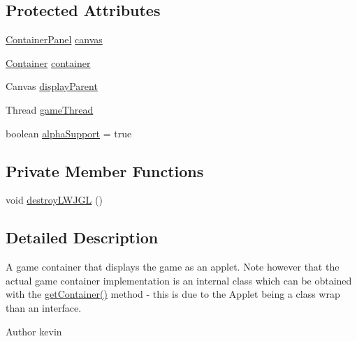 \subsection*{Protected Attributes}
\begin{DoxyCompactItemize}
\item 
\mbox{\hyperlink{classorg_1_1newdawn_1_1slick_1_1_applet_game_container_1_1_container_panel}{Container\+Panel}} \mbox{\hyperlink{classorg_1_1newdawn_1_1slick_1_1_applet_game_container_acf26307e20e497f0fbdabbb5110ab852}{canvas}}
\item 
\mbox{\hyperlink{classorg_1_1newdawn_1_1slick_1_1_applet_game_container_1_1_container}{Container}} \mbox{\hyperlink{classorg_1_1newdawn_1_1slick_1_1_applet_game_container_ad11e66254b14c604db1a66c3d4efc818}{container}}
\item 
Canvas \mbox{\hyperlink{classorg_1_1newdawn_1_1slick_1_1_applet_game_container_a62b5a90dcfc53b23717ea63133f86332}{display\+Parent}}
\item 
Thread \mbox{\hyperlink{classorg_1_1newdawn_1_1slick_1_1_applet_game_container_a490e718a0298d5f4731c117197fb36d0}{game\+Thread}}
\item 
boolean \mbox{\hyperlink{classorg_1_1newdawn_1_1slick_1_1_applet_game_container_a975d5cbb1d3d12649282b6ab406dafce}{alpha\+Support}} = true
\end{DoxyCompactItemize}
\subsection*{Private Member Functions}
\begin{DoxyCompactItemize}
\item 
void \mbox{\hyperlink{classorg_1_1newdawn_1_1slick_1_1_applet_game_container_af77f7ab58fe34f57e2e81343edde8c18}{destroy\+L\+W\+J\+GL}} ()
\end{DoxyCompactItemize}


\subsection{Detailed Description}
A game container that displays the game as an applet. Note however that the actual game container implementation is an internal class which can be obtained with the \mbox{\hyperlink{classorg_1_1newdawn_1_1slick_1_1_applet_game_container_aab420b4026d156dcfb6b5b2bc614d5ce}{get\+Container()}} method -\/ this is due to the Applet being a class wrap than an interface.

\begin{DoxyAuthor}{Author}
kevin 
\end{DoxyAuthor}


